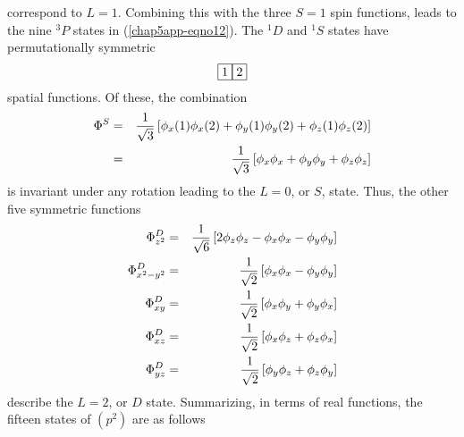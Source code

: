 correspond to $L = 1$.  Combining this with the three $S = 1$ spin 
functions, leads to the nine ${^3P}$ states in
(\ref{chap5app-eqno12}).  The ${^1D}$  
and ${^1S}$ states have permutationally symmetric 
\begin{equation}
\begin{array}{c}
\fbox{1}\fbox{2}
\end{array}
\end{equation}
spatial functions.  Of these, the combination
\begin{eqnarray}
\Phi^S &=& {1 \over \sqrt{3}} \left[ \phi_x (1) \phi_x (2) + \phi_y 
(1) \phi_y (2) + \phi_z (1) \phi_z (2) \right]\cr
&=& {1 \over \sqrt{3}} \left[ \phi_x \phi_x + \phi_y \phi_y + \phi_z 
\phi_z \right]
\label{chap5app-eqno10}
\end{eqnarray}
is invariant under any rotation leading to the $L = 0$, or $S$, 
state.  Thus, the other five symmetric functions
\begin{eqnarray}
\Phi^D_{z^2} &=& {1 \over \sqrt{6}} \left[ 2 \phi_z \phi_z - \phi_x 
\phi_x - \phi_y \phi_y \right]\cr
\Phi^D_{x^2-y^2} &=& {1 \over \sqrt{2}} \left[ \phi_x \phi_x - \phi_y 
\phi_y \right]\cr
\Phi^D_{xy} &=& {1 \over \sqrt{2}} \left[ \phi_x \phi_y + \phi_y 
\phi_x \right]\cr
\Phi^D_{xz} &=& {1 \over \sqrt{2}} \left[ \phi_x \phi_z + \phi_z 
\phi_x \right]\cr
\Phi^D_{yz} &=& {1 \over \sqrt{2}} \left[ \phi_y \phi_z + \phi_z 
\phi_y \right]
%
\label{chap5app-eqno11}
\end{eqnarray}
describe the $L = 2$, or $D$ state.  Summarizing, in terms of real 
functions, the fifteen states of $(p^2)$ are as follows

